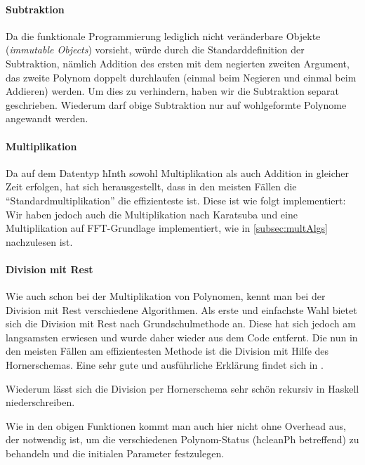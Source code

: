 \paragraph{Subtraktion} Da die funktionale Programmierung lediglich 
nicht veränderbare Objekte (\emph{immutable Objects}) vorsieht, würde durch die
Standarddefinition der Subtraktion, nämlich Addition des ersten mit dem
negierten zweiten Argument, das zweite Polynom doppelt durchlaufen (einmal beim
Negieren und einmal beim Addieren) werden. Um dies zu verhindern, haben wir die
Subtraktion separat geschrieben.
Wiederum darf obige Subtraktion nur auf wohlgeformte Polynome angewandt werden.

\paragraph{Multiplikation}
Da auf dem Datentyp ħIntħ sowohl Multiplikation als auch Addition in gleicher
Zeit erfolgen, hat sich herausgestellt, dass in den meisten Fällen die 
"`Standardmultiplikation"' die effizienteste ist. Diese ist wie folgt
implementiert:
Wir haben jedoch auch die Multiplikation nach Karatsuba und eine Multiplikation
auf FFT-Grundlage implementiert, wie in \autoref{subsec:multAlgs} nachzulesen ist.

\paragraph{Division mit Rest}
Wie auch schon bei der Multiplikation von Polynomen, kennt man bei der Division
mit Rest verschiedene Algorithmen. Als erste und einfachste Wahl bietet sich
die Division mit Rest nach Grundschulmethode an. Diese hat sich jedoch am
langsamsten erwiesen und wurde daher wieder aus dem Code entfernt. Die nun in
den meisten Fällen am effizientesten Methode ist die Division mit Hilfe des
Hornerschemas. Eine sehr gute und ausführliche Erklärung findet sich 
in \autocite{wiki:synthetic-division}.

\begin{beispiel}
  
\end{beispiel}

Wiederum lässt sich die Division per Hornerschema sehr schön rekursiv in
Haskell niederschreiben.

Wie in den obigen Funktionen kommt man auch hier nicht ohne Overhead aus, der
notwendig ist, um die verschiedenen Polynom-Status (ħcleanPħ betreffend) zu
behandeln und die initialen Parameter festzulegen.

